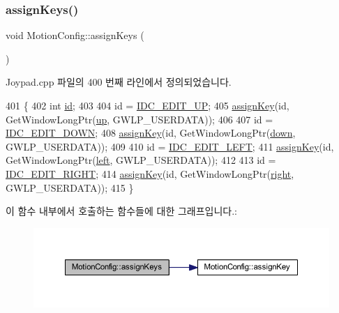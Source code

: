 \subsubsection{\texorpdfstring{assign\+Keys()}{assignKeys()}}
{\footnotesize\ttfamily void Motion\+Config\+::assign\+Keys (\begin{DoxyParamCaption}{ }\end{DoxyParamCaption})}



Joypad.\+cpp 파일의 400 번째 라인에서 정의되었습니다.


\begin{DoxyCode}
401 \{
402   \textcolor{keywordtype}{int} \mbox{\hyperlink{_commands_8cpp_a7b7a6396b2c82ad46c6d8b2bf141a8dd}{id}};
403 
404   \textcolor{keywordtype}{id} = \mbox{\hyperlink{resource_8h_ae0645e746a25d4d061e3fae80babcc78}{IDC\_EDIT\_UP}};
405   \mbox{\hyperlink{class_motion_config_a50d94176c92cf39ca894892a0b3bf2ef}{assignKey}}(\textcolor{keywordtype}{id}, GetWindowLongPtr(\mbox{\hyperlink{class_motion_config_a44c25ec4fbd230d6fe19416d8c280157}{up}}, GWLP\_USERDATA));
406 
407   \textcolor{keywordtype}{id} = \mbox{\hyperlink{resource_8h_a3c298d6303318c2193f262cfae3e413c}{IDC\_EDIT\_DOWN}};
408   \mbox{\hyperlink{class_motion_config_a50d94176c92cf39ca894892a0b3bf2ef}{assignKey}}(\textcolor{keywordtype}{id}, GetWindowLongPtr(\mbox{\hyperlink{class_motion_config_a0fd0b825d61a2959b3dd20ea3c0fb9ad}{down}}, GWLP\_USERDATA));
409 
410   \textcolor{keywordtype}{id} = \mbox{\hyperlink{resource_8h_ae8bd1d3525011019fb5ff9406e0d2404}{IDC\_EDIT\_LEFT}};
411   \mbox{\hyperlink{class_motion_config_a50d94176c92cf39ca894892a0b3bf2ef}{assignKey}}(\textcolor{keywordtype}{id}, GetWindowLongPtr(\mbox{\hyperlink{class_motion_config_a634ed163b30d08aceb8573542ee7fc07}{left}}, GWLP\_USERDATA));
412 
413   \textcolor{keywordtype}{id} = \mbox{\hyperlink{resource_8h_ae29438ab510968afa9068e0c6b80ed57}{IDC\_EDIT\_RIGHT}};
414   \mbox{\hyperlink{class_motion_config_a50d94176c92cf39ca894892a0b3bf2ef}{assignKey}}(\textcolor{keywordtype}{id}, GetWindowLongPtr(\mbox{\hyperlink{class_motion_config_ae9203bef30efdd067ea44d1f7cded8dc}{right}}, GWLP\_USERDATA));
415 \}
\end{DoxyCode}
이 함수 내부에서 호출하는 함수들에 대한 그래프입니다.\+:
\nopagebreak
\begin{figure}[H]
\begin{center}
\leavevmode
\includegraphics[width=350pt]{class_motion_config_a73d6bc239e8abd59b68f23ddaaf6daf4_cgraph}
\end{center}
\end{figure}
